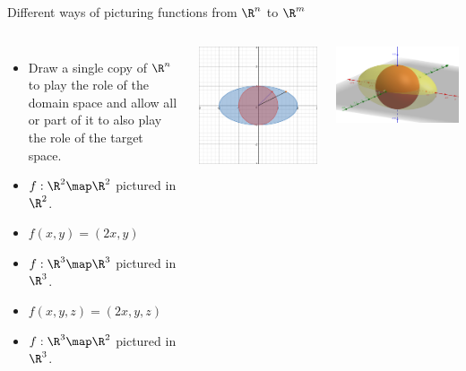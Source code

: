 \documentclass{beamer}
\begin{document}
\begin{frame}{Different ways of picturing functions from $\R^n$ to $\R^m$}

\begin{columns}
\column[T]{5cm}
\begin{itemize}
\item Draw a single copy of $\R^n$ to play the role of the domain space
and allow all or part of it to also play the role of the target space.
\item $f:\R^2\map\R^2$ pictured in $\R^2$.
\item $f(x,y) = (2x, y)$
\item $f:\R^3\map\R^3$ pictured in $\R^3$.
\item $f(x,y, z) = (2x, y, z)$
\item $f:\R^3\map\R^2$ pictured in $\R^3$.
\end{itemize}

\column[T]{5cm}
\includegraphics[scale=0.1]{circle-to-ellipse}

\includegraphics[scale=0.15]{sphere-to-ellipsoid}


\end{columns}
\end{frame}
\end{document}

